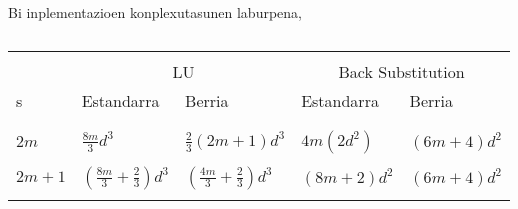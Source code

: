 Bi inplementazioen konplexutasunen laburpena,
\begin{table}[h!]
\caption[LU deskonposaketak] 
{\small{}}
\label{tab:Olu}       
\centering
{%
\begin{tabular}{ l l l l l } 
 \hline
\\
                 &  \multicolumn{2}{c}{LU}  & \multicolumn{2}{c}{Back Substitution}  \\
 s               & Estandarra  & Berria     &  Estandarra  &              Berria     \\
\\
 \hline
\\
 $2m$            &   $\frac{8m}{3} d^3$                              &  $\frac{2}{3} (2m+1) d^3$ 
                 &   $4m (2d^2)$      &     $(6m+4)d^2$                                             \\
 \\
 $2m+1$          &   $\left(\frac{8m}{3} + \frac{2}{3}\right) d^3$   &  $\left(\frac{4m}{3}+\frac{2}{3}\right) d^3$
                 &   $(8m+2)d^2$      &     $(6m+4)d^2$\\  
 \\  
   \hline
 \end{tabular}}
\end{table}